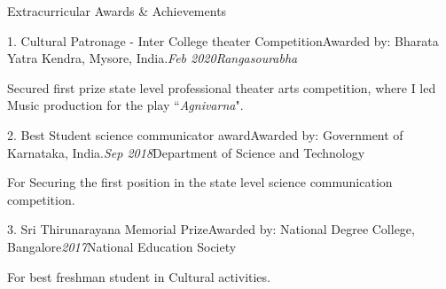 \begin{section}{Extracurricular Awards \& Achievements}
    \begin{subsectionnobullet}{1. Cultural Patronage - Inter College theater Competition}{Awarded by: Bharata Yatra Kendra, Mysore, India.}{\textit{Feb 2020}}{\textit{Rangasourabha}}
        \item{Secured first prize state level professional theater arts competition, where I led Music production for the play ``\textit{Agnivarna}".}
    \end{subsectionnobullet}


    \begin{subsectionnobullet}{2. Best Student science communicator award}{Awarded by: Government of Karnataka, India.}{\textit{Sep 2018}}{Department of Science and Technology}
        \item{For Securing the first position in the state level science communication competition.}
    \end{subsectionnobullet}

    \begin{subsectionnobullet}{3. Sri Thirunarayana Memorial Prize}{Awarded by: National Degree College, Bangalore}{\textit{2017}}{National Education Society}
        \item{For best freshman student in Cultural activities.}
    \end{subsectionnobullet}


    

\end{section}